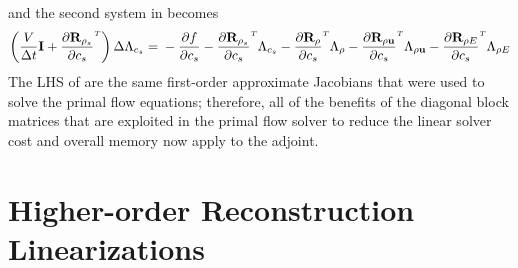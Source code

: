 and the second system in  becomes
\begin{equation}
  \left( \frac{V}{\Delta t} \mi + \rtdiff{\rho_s}{c_s} \right) \Delta
  \adjlam{c_s}
  = \\ -\pd{f}{c_s}
  - \rtdiff{\rho_s}{c_s} \adjlam{c_s}
  - \rtdiff{\rho}{c_s} \adjlam{\rho}
  - \rtdiff{\rho \vu}{c_s} \adjlam{\rho \vu}
  - \rtdiff{\rho E}{c_s} \adjlam{\rho E}
  \label{adj-dc-time2}
\end{equation}
The LHS of  are the same first-order
approximate Jacobians that were used to solve the primal flow equations;
therefore, all of the benefits of the diagonal block matrices that are
exploited in the primal flow solver to reduce the linear solver cost and overall
memory now apply to the adjoint.

\section{Higher-order Reconstruction Linearizations}

